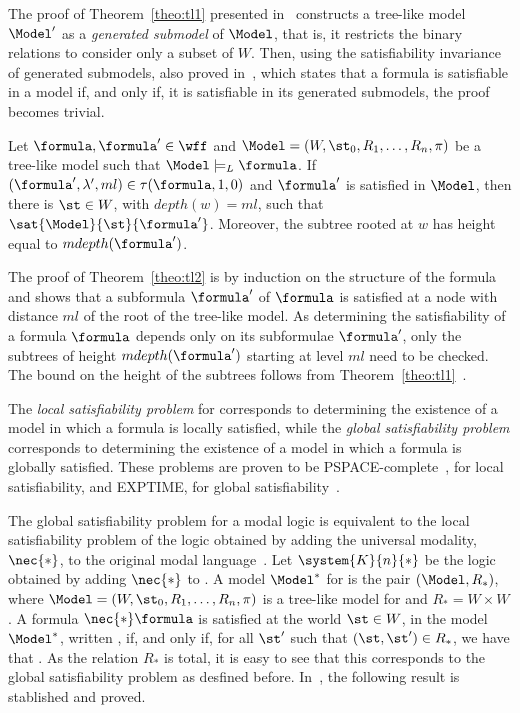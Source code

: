 \begin{example}
    The proof of Theorem~\ref{theo:tl1} presented in~\cite{blackburn2002modal}
    constructs a tree-like model $\Model'$ as a \emph{generated submodel} of
    $\Model$, that is, it restricts the binary relations to consider only a
    subset of $W$. Then, using the satisfiability invariance of generated
    submodels, also proved in~\cite{blackburn2002modal}, which states that a
    formula is satisfiable in a model if, and only if, it is satisfiable in its
    generated submodels, the proof becomes trivial.

    \begin{theorem}%
        \label{theo:tl2}
        Let $\formula, \formula' \in \wff$ and $\Model = (W, \st_0, R_1, \ldots,
        R_n, \pi)$ be a tree-like model such that $\Model \models_L \formula$. If
        $(\formula', \lambda', ml) \in \tau(\formula, 1, 0)$ and
        $\formula'$ is satisfied in $\Model$, then there is $\st \in W$, with
        $depth(w) = ml$, such that $\sat{\Model}{\st}{\formula'}$. Moreover,
        the subtree rooted at $w$ has height equal to $mdepth(\formula')$.
    \end{theorem}

    The proof of Theorem~\ref{theo:tl2} is by induction on the structure of the
    formula and shows that a subformula $\formula'$ of $\formula$ is satisfied
    at a node with distance $ml$ of the root of the tree-like model. As
    determining the satisfiability of a formula $\formula$ depends only on its
    subformulae $\formula'$, only the subtrees of height $mdepth(\formula')$
    starting at level $ml$ need to be checked. The bound on the height of the
    subtrees follows from Theorem~\ref{theo:tl1}~\cite{nalon2015modal}.
\end{example}

The \emph{local satisfiability problem} for  corresponds to
determining the existence of a model in which a formula is locally satisfied,
while the \emph{global satisfiability problem} corresponds to determining the
existence of a model in which a formula is globally satisfied. These problems
are proven to be PSPACE-complete~\cite{Spaan:coml}, for local satisfiability,
and EXPTIME, for global satisfiability~\cite{Spaan:coml}.

The global satisfiability problem for a modal logic is equivalent to the local
satisfiability problem of the logic obtained by adding the universal modality,
$\nec{*}$, to the original modal language~\cite{goranko1992using}. Let
$\system{K}{n}{*}$ be the logic obtained by adding $\nec{*}$ to .
A model $\Model^*$ for  is the pair $(\Model, R_*)$, where
$\Model = (W, \st_0, R_1, \ldots, R_n, \pi)$ is a tree-like model for
 and $R_* = W \times W$. A formula
$\nec{*} \formula$ is satisfied at the world $\st \in W$, in the model
$\Model^*$, written \sat{\Model^*}{\st}{\nec{*}\formula}, if, and only if, for
all $\st'$ such that $ (\st,\st')\in R_*$, we have that
. As the relation $R_*$ is total, it is easy to
see that this corresponds to the global satisfiability problem as desfined
before. In~\cite{goranko1992using}, the following result is stablished and
proved.

